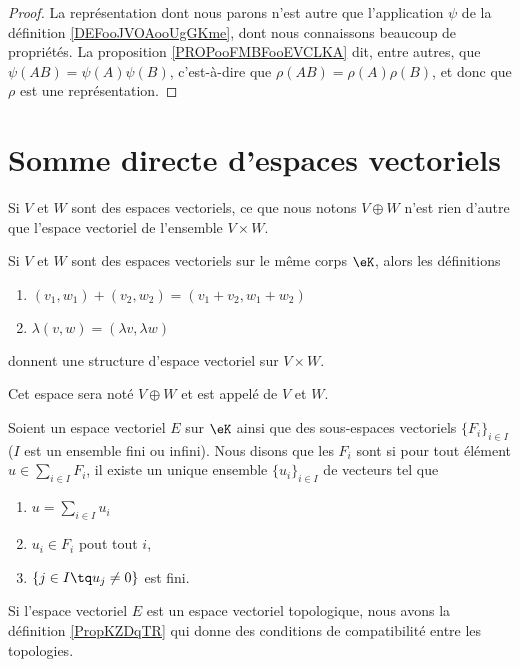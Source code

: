\begin{proof}
	La représentation dont nous parons n'est autre que l'application \( \psi\) de la définition \ref{DEFooJVOAooUgGKme}, dont nous connaissons beaucoup de propriétés. La proposition \ref{PROPooFMBFooEVCLKA} dit, entre autres, que \( \psi(AB)=\psi(A)\psi(B)\), c'est-à-dire que \( \rho(AB)=\rho(A)\rho(B)\), et donc que \( \rho\) est une représentation.
\end{proof}


\section{Somme directe d'espaces vectoriels}

Si \( V\) et \( W\) sont des espaces vectoriels, ce que nous notons \( V\oplus W\) n'est rien d'autre que l'espace vectoriel de l'ensemble \( V\times W\).

\begin{propositionDef}                      \label{DEFooJKAWooKkkkwm}
	Si \( V\) et \( W\) sont des espaces vectoriels sur le même corps \( \eK\), alors les définitions
	\begin{enumerate}
		\item
		      \( (v_1,w_1)+(v_2,w_2)=(v_1+v_2,w_1+w_2)\)
		\item
		      \( \lambda(v,w)=(\lambda v,\lambda w)\)
	\end{enumerate}
	donnent une structure d'espace vectoriel sur \( V\times W\).

	Cet espace sera noté \( V\oplus W\) et est appelé  de \( V\) et \( W\).
\end{propositionDef}

\begin{definition}       \label{DEFooIJDNooRUDUYF}
	Soient un espace vectoriel \( E\) sur \(\eK\) ainsi que des sous-espaces vectoriels \( \{ F_i \}_{i\in I}\) (\( I\) est un ensemble fini ou infini). Nous disons que les \( F_i\) sont  si pour tout élément \( u\in\sum_{i\in I}F_i\), il existe un unique ensemble \( \{ u_i \}_{i\in I}\) de vecteurs tel que
	\begin{enumerate}
		\item
		      \( u=\sum_{i\in I}u_i\)
		\item
		      \( u_i\in F_i\) pout tout \( i\),
		\item
		      \( \{ j\in I\tq u_j\neq 0 \}\) est fini.
	\end{enumerate}

	Si l'espace vectoriel \( E\) est un espace vectoriel topologique, nous avons la définition \ref{PropKZDqTR} qui donne des conditions de compatibilité entre les topologies.
\end{definition}


